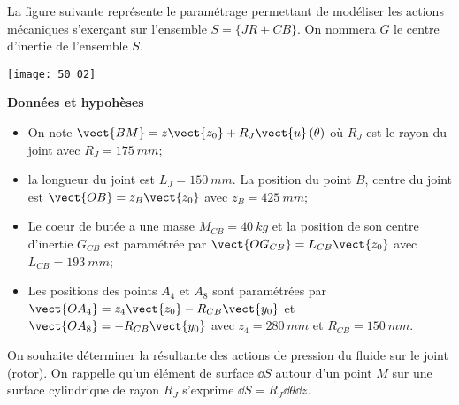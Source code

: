 \normaltrue \difficilefalse \tdifficilefalse
\correctionfalse


\setcounter{question}{0}%
\ifcorrection
\else
{}
\fi
\ifprof
\else


\ifprof
\else
La figure suivante représente le paramétrage permettant de modéliser les actions mécaniques
s’exerçant sur l’ensemble $S=\{JR+CB\}$. On nommera $G$ le centre d’inertie de l’ensemble
$S$.


\begin{marginfigure}
\centering
\texttt{[image: 50\_02]}
\end{marginfigure}
\fi

\textbf{Données et hypohèses}

\begin{itemize}
\item On note $\vect{BM}=z\vect{z_0}+R_J\vect{u}\left(\theta\right)$ où $R_J$ est le rayon du joint avec $R_J = \SI{175}{mm}$;
\item la longueur du joint est $L_J = \SI{150}{mm}$. La position du point $B$, centre du joint est $\vect{OB}=z_B\vect{z_0}$ avec $z_B = \SI{425}{mm}$;
\item Le coeur de butée a une masse $M_{CB} = \SI{40}{kg}$ et la position de son centre d’inertie $G_{CB}$ est paramétrée par $\vect{OG_{CB}}= L_{CB}\vect{z_0}$ avec $L_{CB} = \SI{193}{mm}$;
\item Les positions des points $A_4$ et $A_8$ sont paramétrées par $\vect{OA_4} = z_4\vect{z_0}-R_{CB}\vect{y_0}$ et
$\vect{OA_8}=-R_{CB}\vect{y_0}$ avec $z_4 = \SI{280}{mm}$ et $R_{CB}=\SI{150}{mm}$.
\end{itemize}


On souhaite déterminer la résultante des actions de pression du fluide sur le joint (rotor).
On rappelle qu’un élément de surface $\dd S$ autour d’un point $M$ sur une surface cylindrique
de rayon $R_J$ s’exprime $\dd S = R_J \dd \theta \dd z$.

